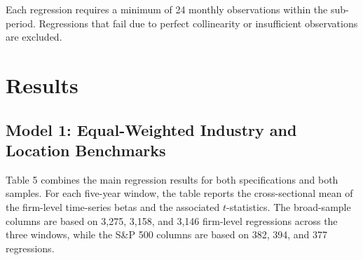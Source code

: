 \documentclass[
  12pt,
]{article}
\begin{document}
Each regression requires a minimum of 24 monthly observations within the
sub-period. Regressions that fail due to perfect collinearity or
insufficient observations are excluded.

\section{Results}\label{results}

\subsection{Model 1: Equal-Weighted Industry and Location
Benchmarks}\label{model-1-equal-weighted-industry-and-location-benchmarks}

Table 5 combines the main regression results for both specifications and
both samples. For each five-year window, the table reports the
cross-sectional mean of the firm-level time-series betas and the
associated \(t\)-statistics. The broad-sample columns are based on
3,275, 3,158, and 3,146 firm-level regressions across the three windows,
while the S\&P 500 columns are based on 382, 394, and 377 regressions.
\end{document}
